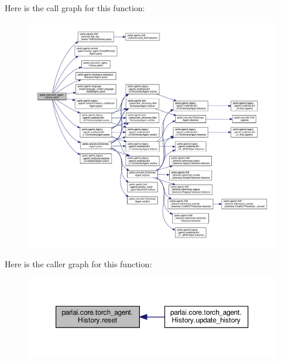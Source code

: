 Here is the call graph for this function\+:
\nopagebreak
\begin{figure}[H]
\begin{center}
\leavevmode
\includegraphics[width=350pt]{classparlai_1_1core_1_1torch__agent_1_1History_a82e02d0b34707b2e00b95bc659411bae_cgraph}
\end{center}
\end{figure}
Here is the caller graph for this function\+:
\nopagebreak
\begin{figure}[H]
\begin{center}
\leavevmode
\includegraphics[width=350pt]{classparlai_1_1core_1_1torch__agent_1_1History_a82e02d0b34707b2e00b95bc659411bae_icgraph}
\end{center}
\end{figure}
\mbox{\label{classparlai_1_1core_1_1torch__agent_1_1History_ac7bdfbe78c9f6aed1118161bd24a7c8e}} 
